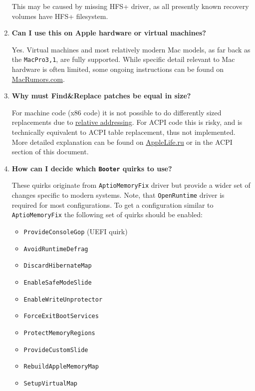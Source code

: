 \documentclass[]{article}
\providecommand{\tightlist}{%
  \setlength{\itemsep}{0pt}\setlength{\parskip}{0pt}}
\begin{document}
\begin{enumerate}
  This may be caused by missing HFS+ driver, as all presently known recovery volumes
  have HFS+ filesystem.

\item
  \textbf{Can I use this on Apple hardware or virtual machines?}

  Yes. Virtual machines and most relatively modern Mac models, as far back as the \texttt{MacPro3,1},
  are fully supported. While specific detail relevant to Mac hardware is often limited,
  some ongoing instructions can be found on
  \href{https://forums.macrumors.com/threads/2207814}{MacRumors.com}.

\item
  \textbf{Why must Find\&Replace patches be equal in size?}

  For machine code (x86 code) it is not possible to do differently sized replacements due to
  \href{https://en.wikipedia.org/w/index.php?title=Relative_addressing}{relative addressing}.
  For ACPI code this is risky, and is technically equivalent to ACPI table replacement,
  thus not implemented. More detailed explanation can be found on
  \href{https://applelife.ru/posts/819790}{AppleLife.ru} or in the ACPI section of this document.

\item
  \textbf{How can I decide which \texttt{Booter} quirks to use?}

  These quirks originate from \texttt{AptioMemoryFix} driver but provide a wider
  set of changes specific to modern systems. Note, that \texttt{OpenRuntime}
  driver is required for most configurations. To get a configuration similar
  to \texttt{AptioMemoryFix} the following set of quirks should be enabled:
  \begin{itemize}
  \tightlist
  \item \texttt{ProvideConsoleGop} (UEFI quirk)
  \item \texttt{AvoidRuntimeDefrag}
  \item \texttt{DiscardHibernateMap}
  \item \texttt{EnableSafeModeSlide}
  \item \texttt{EnableWriteUnprotector}
  \item \texttt{ForceExitBootServices}
  \item \texttt{ProtectMemoryRegions}
  \item \texttt{ProvideCustomSlide}
  \item \texttt{RebuildAppleMemoryMap}
  \item \texttt{SetupVirtualMap}
  \end{itemize}


\end{enumerate}
\end{document}
